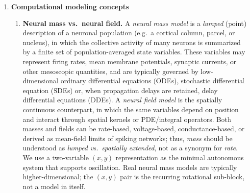 \documentclass[12pt]{article}
\numberwithin{equation}{section}
\newcommand{\rev}[1]{\begingroup\color{navyblue}#1\endgroup}
\begin{document}
\begin{enumerate}
\item \textbf{Computational modeling concepts} 
\begin{enumerate} 
\item  \rev{\textbf{Neural mass vs.\ neural field.}
A \emph{neural mass model} is a \emph{lumped} (point) description of a neuronal
population (e.g.\ a cortical column, parcel, or nucleus), in which the collective activity
of many neurons is summarized by a finite set of population-averaged state variables.
These variables may represent firing rates, mean membrane potentials, synaptic currents,
or other mesoscopic quantities, and are typically governed by low-dimensional ordinary differential equations (ODEs), stochastic differential equation (SDEs) or,
when propagation delays are retained,  delay differential equations (DDEs).
A \emph{neural field model} is the spatially continuous counterpart, in which the same
variables depend on position and interact through spatial kernels or PDE/integral operators.
Both masses and fields can be rate-based, voltage-based, conductance-based, or derived
as mean-field limits of spiking networks; thus, \emph{mass} should be understood as
\emph{lumped vs.\ spatially extended}, not as a synonym for \emph{rate}.
\smallskip
We use a two-variable $(x,y)$ representation as the minimal autonomous system that supports oscillation. Real neural mass models are typically higher-dimensional; the $(x,y)$ pair is the recurring rotational sub-block, not a model in itself.}


\end{enumerate}
\end{enumerate}
\end{document}
